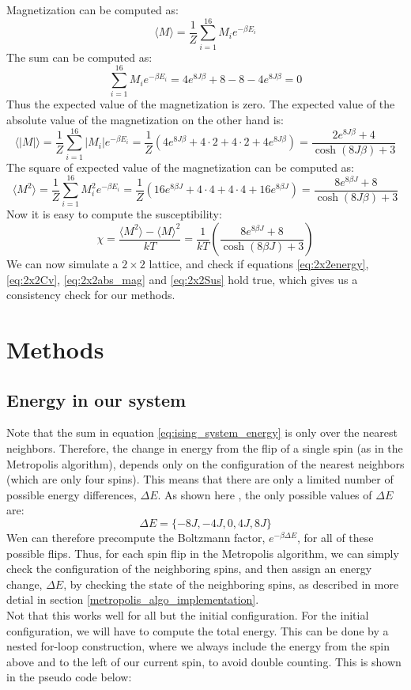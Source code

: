 \documentclass[a4paper, 10pt]{article}
\begin{document}
Magnetization can be computed as:
$$\langle M \rangle=\frac{1}{Z}\sum_{i=1}^{16}M_ie^{-\beta E_i}$$
The sum can be computed as:
$$\sum_{i=1}^{16}M_ie^{-\beta E_i}=4e^{8J\beta}+8-8-4e^{8J\beta}=0$$
Thus the expected value of the magnetization is zero. The expected value of the absolute value of the magnetization on the other hand is:
\begin{equation}\label{eq:2x2abs_mag}
\langle |M|\rangle =\frac{1}{Z}\sum_{i=1}^{16}|M_i|e^{-\beta E_i}=\frac{1}{Z}\left( 4e^{8J\beta}+4\cdot 2+ 4\cdot 2 +4e^{8J\beta}\right)=\frac{2e^{8J\beta}+4}{\cosh(8J\beta)+3}
\end{equation}
The square of expected value of the magnetization can be computed as:
$$\langle M^2 \rangle = \frac{1}{Z}\sum_{i=1}^{16}M_i^2e^{-\beta E_i}=\frac{1}{Z}\left(16e^{8\beta J}+4\cdot 4+4\cdot 4+16e^{8\beta J}\right)=\frac{8e^{8\beta J}+8}{\cosh(8J\beta)+3}$$
Now it is easy to compute the susceptibility:
\begin{equation}\label{eq:2x2Sus}
\chi = \frac{\langle M^2\rangle - \langle M \rangle^2}{kT}=\frac{1}{kT}\left(\frac{8e^{8\beta J}+8}{\cosh(8\beta J)+3}\right)
\end{equation}
We can now simulate a $2\times 2$ lattice, and check if equations \ref{eq:2x2energy}, \ref{eq:2x2Cv}, \ref{eq:2x2abs_mag} and \ref{eq:2x2Sus} hold true, which gives us a consistency check for our methods.
\section{Methods}
\subsection{Energy in our system}\label{energy_in_system}
Note that the sum in equation \ref{eq:ising_system_energy} is only over the nearest neighbors. Therefore, the change in energy from the flip of a single spin (as in the Metropolis algorithm), depends only on the configuration of the nearest neighbors (which are only four spins). This means that there are only a limited number of possible energy differences, $\Delta E$. As shown here \cite{Metropolis}, the only possible values of $\Delta E$ are:
$$\Delta E = \{ -8J, -4J, 0, 4J, 8J\}$$
Wen can therefore precompute the Boltzmann factor, $e^{-\beta \Delta E}$, for all of these possible flips. Thus, for each spin flip in the Metropolis algorithm, we can simply check the configuration of the neighboring spins, and then assign an energy change, $\Delta E$, by checking the state of the neighboring spins, as described in more detial in section \ref{metropolis_algo_implementation}.\\
\linebreak
Not that this works well for all but the initial configuration. For the initial configuration, we will have to compute the total energy. This can be done by a nested for-loop construction, where we always include the energy from the spin above and to the left of our current spin, to avoid double counting. This is shown in the pseudo code below:

\end{document}
